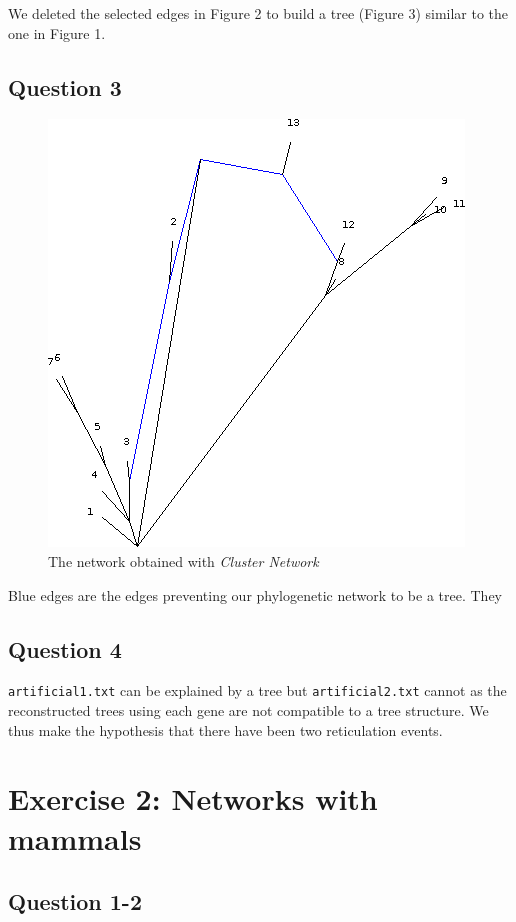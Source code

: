 \documentclass[]{article}
\theoremstyle{definition}
\begin{document}
We deleted the selected edges in Figure 2 to build a tree (Figure 3) similar to the one in Figure 1.

\subsection{Question 3}

\begin{figure}[H]
	\centering
	\includegraphics*[scale=0.5]{image/ex1qt3arti2.png}
	\caption{ The network obtained with \textit{Cluster Network} }
\end{figure}

Blue edges are the edges preventing our phylogenetic network to be a tree. They 

\subsection{Question 4}

\texttt{artificial1.txt} can be explained by a tree but \texttt{artificial2.txt} cannot as the reconstructed trees using each gene are not compatible to a tree structure. We thus make the hypothesis that there have been two reticulation events.

\section{Exercise 2: Networks with mammals}
\subsection{Question 1-2}
\end{document}
